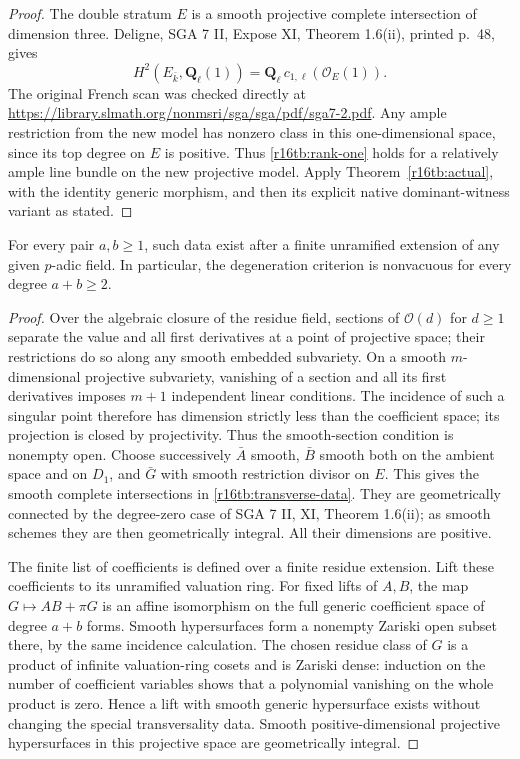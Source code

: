 \begin{proof}
The double stratum $E$ is a smooth projective complete intersection
of dimension three. Deligne, SGA 7 II, Expose XI, Theorem 1.6(ii),
printed p.~48, gives
\[
 H^2(E_{\bar k},\mathbf Q_\ell(1))
           =\mathbf Q_\ell\,c_{1,\ell}(\mathcal O_E(1)).
\]
The original French scan was checked directly at
\url{https://library.slmath.org/nonmsri/sga/sga/pdf/sga7-2.pdf}.
Any ample restriction from the new model has nonzero class
in this one-dimensional space, since its top degree on $E$
is positive. Thus \eqref{r16tb:rank-one} holds for a relatively
ample line bundle on the new projective model. Apply
Theorem~\ref{r16tb:actual}, with the identity generic morphism,
and then its explicit native dominant-witness variant as stated.
\end{proof}

\begin{corollary}
\label{r16tb:nonempty}
For every pair $a,b\geq1$, such data exist after a finite
unramified extension of any given $p$-adic field. In particular,
the degeneration criterion is nonvacuous for every degree
$a+b\geq2$.
\end{corollary}

\begin{proof}
Over the algebraic closure of the residue field, sections of
$\mathcal O(d)$ for $d\geq1$ separate the value and all first
derivatives at a point of projective space; their restrictions
do so along any smooth embedded subvariety. On a smooth
$m$-dimensional projective subvariety, vanishing of a section
and all its first derivatives imposes $m+1$ independent linear
conditions. The incidence of such a singular point therefore
has dimension strictly less than the coefficient space; its
projection is closed by projectivity. Thus the smooth-section
condition is nonempty open. Choose successively $\bar A$ smooth,
$\bar B$ smooth both on the ambient space and on $D_1$, and
$\bar G$ with smooth restriction divisor on $E$. This gives
the smooth complete intersections in \eqref{r16tb:transverse-data}.
They are geometrically connected by the degree-zero case of
SGA 7 II, XI, Theorem 1.6(ii); as smooth schemes they are then
geometrically integral. All their dimensions are positive.

The finite list of coefficients is defined over a finite residue
extension. Lift these coefficients to its unramified valuation
ring. For fixed lifts of $A,B$, the map
$G\mapsto AB+\pi G$ is an affine isomorphism on the full
generic coefficient space of degree $a+b$ forms. Smooth
hypersurfaces form a nonempty Zariski open subset there, by
the same incidence calculation.
The chosen residue class of $G$ is a product of infinite
valuation-ring cosets and is Zariski dense: induction on the
number of coefficient variables shows that a polynomial
vanishing on the whole product is zero. Hence a lift with
smooth generic hypersurface exists without changing the
special transversality data. Smooth positive-dimensional
projective hypersurfaces in this projective space are
geometrically integral.
\end{proof}

